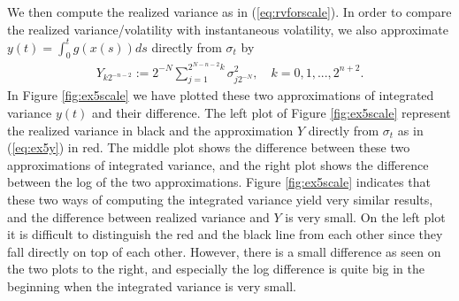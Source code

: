 \documentclass{article}
\begin{document}
We then compute the realized variance as in (\ref{eq:rvforscale}). In order to compare the realized variance/volatility with instantaneous volatility, we also approximate $y(t) = \int_0^t g\left(x(s)\right) ds$ directly from $\sigma_t$ by 
\begin{align}
Y_{k2^{-n-2}}:= 2^{-N} \sum_{j=1}^{2^{N-n-2}k} \sigma^2_{j2^{-N}}, \quad k=0,1,...,2^{n+2}. \label{eq:ex5y}
\end{align}
In Figure \ref{fig:ex5scale} we have plotted these two approximations of integrated variance $y(t)$ and their difference. The left plot of Figure \ref{fig:ex5scale} represent the realized variance in black and the approximation $Y$ directly from $\sigma_t$ as in (\ref{eq:ex5y}) in red. The middle plot shows the difference between these two approximations of integrated variance, and the right plot shows the difference between the log of the two approximations. Figure \ref{fig:ex5scale} indicates that these two ways of computing the integrated variance yield very similar results, and the difference between realized variance and $Y$ is very small. On the left plot it is difficult to distinguish the red and the black line from each other since they fall directly on top of each other. However, there is a small difference as seen on the two plots to the right, and especially the log difference is quite big in the beginning when the integrated variance is very small. \\
\end{document}
